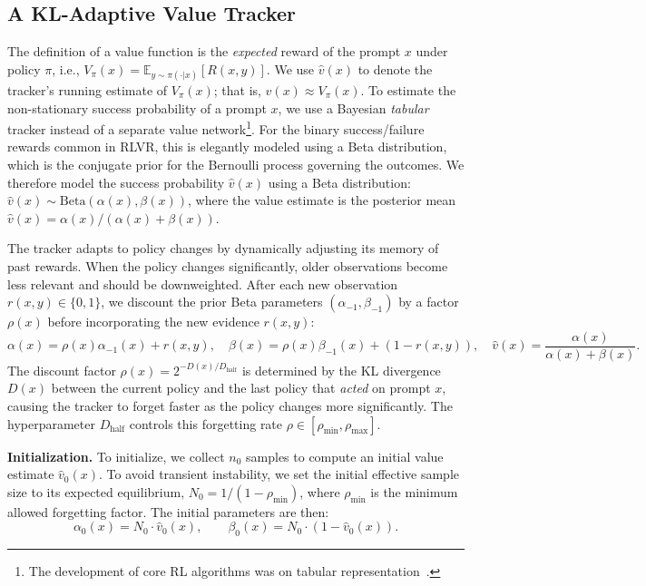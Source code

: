 \subsection{A KL-Adaptive Value Tracker}\label{sec:tracker}
The definition of a value function is the \emph{expected} reward of the prompt $x$ under policy $\pi$, i.e., $V_\pi(x) = \mathbb{E}_{y \sim \pi(\cdot|x)}[R(x,y)]$. We use \(\hat{v}(x)\) to denote the tracker’s running estimate of $V_\pi(x)$; that is, \(\hat{v}(x) \approx V_\pi(x)\). 
To estimate the non-stationary success probability of a prompt $x$, we use a Bayesian \emph{tabular} tracker instead of a separate value network\footnote{The development of core RL algorithms was on tabular representation~\cite{rlbook}.}. For the binary success/failure rewards common in RLVR, this is elegantly modeled using a Beta distribution, which is the conjugate prior for the Bernoulli process governing the outcomes. We therefore model the success probability $\hat{v}(x)$ using a Beta distribution: $\hat{v}(x) \sim \text{Beta}(\alpha(x), \beta(x))$, where the value estimate is the posterior mean $\hat{v}(x) = \alpha(x) / (\alpha(x) + \beta(x))$.

The tracker adapts to policy changes by dynamically adjusting its memory of past rewards. When the policy changes significantly, older observations become less relevant and should be downweighted. After each new observation $r(x, y) \in \{0, 1\}$, we discount the prior Beta parameters $(\alpha_{-1}, \beta_{-1})$ by a factor $\rho(x)$ before incorporating the new evidence $r(x,y)$:
\begin{equation}
    \alpha(x) = \rho(x) \alpha_{-1}(x) + r(x, y),  \quad 
    \beta(x)  = \rho(x) \beta_{-1}(x) + (1 - r(x, y)), \quad \hat{v}(x) = \frac{\alpha(x)}{\alpha(x) + \beta(x)}.
\end{equation}
The discount factor $\rho(x) = 2^{-D(x) / D_\text{half}}$ is determined by the KL divergence $D(x)$ between the current policy and the last policy that \emph{acted} on prompt $x$, causing the tracker to forget faster as the policy changes more significantly. The hyperparameter $D_\text{half}$ controls this forgetting rate $\rho \in [\rho_\text{min}, \rho_\text{max}]$.

\textbf{Initialization.} To initialize, we collect $n_0$ samples to compute an initial value estimate $\hat{v}_{0}(x)$. To avoid transient instability, we set the initial effective sample size to its expected equilibrium, $N_0 = 1 / (1 - \rho_{\min})$, where $\rho_{\min}$ is the minimum allowed forgetting factor. The initial parameters are then:
\begin{equation}
\alpha_0(x) = N_0 \cdot \hat{v}_{0}(x),  \qquad \beta_0(x) = N_0 \cdot (1 -\hat{v}_{0}(x)).
\end{equation}

